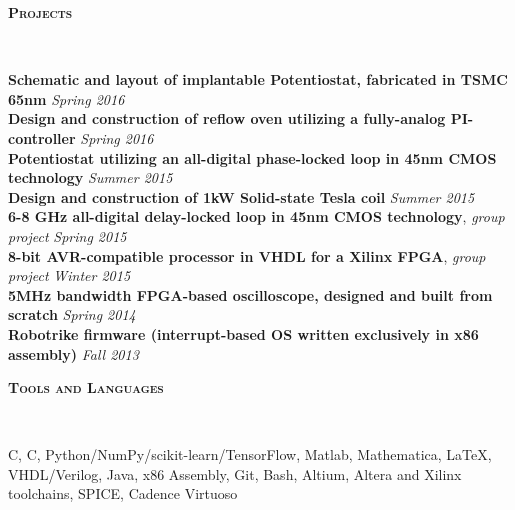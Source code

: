 \documentclass{article}
\newenvironment{changemargin}[2]{%
  \begin{list}{}{%
    \setlength{\topsep}{0pt}%
    \setlength{\leftmargin}{#1}%
    \setlength{\rightmargin}{#2}%
    \setlength{\listparindent}{\parindent}%
    \setlength{\itemindent}{\parindent}%
    \setlength{\parsep}{\parskip}%
  }%
  \item[]}{\end{list}
}
\newcommand{\lineover}{
	\begin{changemargin}{-0.05in}{-0.05in}
		\vspace*{-8pt}
		\hrulefill \\
		\vspace*{-2pt}
	\end{changemargin}
}
\newcommand{\header}[1]{
	\begin{changemargin}{-.5in}{-0.5in}
		{\large \textbf{\scshape{#1}}}\\
  	\lineover
	\end{changemargin}
}
\newenvironment{body} {
	\vspace*{-16pt}
	\begin{changemargin}{-0.25in}{-0.5in}
  }	
	{\end{changemargin}
}
\newcommand{\CC}{C\nolinebreak\hspace{-.05em}\raisebox{.4ex}{\tiny\bf +}\nolinebreak\hspace{-.10em}\raisebox{.4ex}{\tiny\bf +}}
\begin{document}
\newpage
\header{Projects}
\begin{body}
	\vspace{14pt}
	\textbf{Schematic and layout of implantable Potentiostat, fabricated in TSMC 65nm} \hfill \emph{Spring 2016}\\
	\textbf{Design and construction of reflow oven utilizing a fully-analog PI-controller} \hfill \emph{Spring 2016}\\
	\textbf{Potentiostat utilizing an all-digital phase-locked loop in 45nm CMOS technology} \hfill \emph{Summer 2015}\\
	\textbf{Design and construction of 1kW Solid-state Tesla coil} \hfill \emph{Summer 2015} \\
	\textbf{6-8 GHz all-digital delay-locked loop in 45nm CMOS technology}, \emph{group project} \hfill \emph{Spring 2015}\\
	\textbf{8-bit AVR-compatible processor in VHDL for a Xilinx FPGA}, \emph{group project} \hfill \emph{Winter 2015}\\
	\textbf{5MHz bandwidth FPGA-based oscilloscope, designed and built from scratch} \hfill \emph{Spring 2014}\\
	\textbf{Robotrike firmware (interrupt-based OS written exclusively in x86 assembly)} \hfill \emph{Fall 2013}\\
\end{body}

\medskip

\header{Tools and Languages}

\begin{body}
	\vspace{14pt}
	C, \CC, Python/NumPy/scikit-learn/TensorFlow, Matlab, Mathematica, \LaTeX, VHDL/Verilog, Java, x86 Assembly, Git, Bash, Altium, Altera and Xilinx toolchains, SPICE, Cadence Virtuoso
\end{body}
\end{document}
